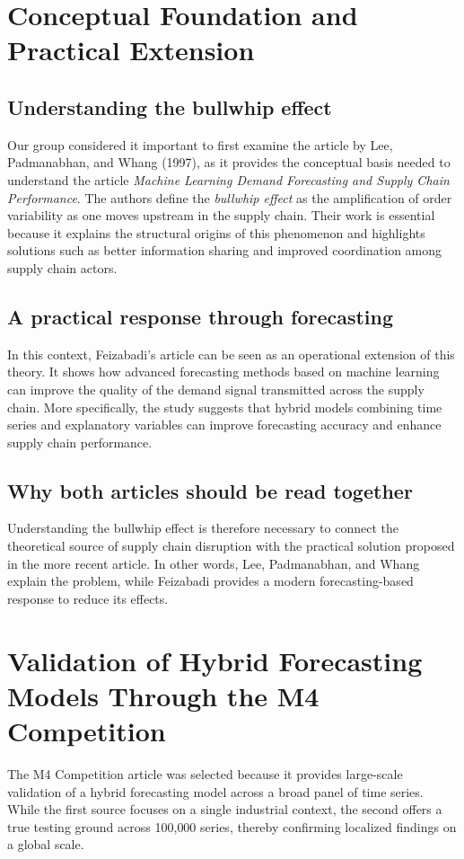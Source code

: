 \section{Conceptual Foundation and Practical Extension}

\subsection{Understanding the bullwhip effect}

Our group considered it important to first examine the article by Lee, Padmanabhan, and Whang (1997), as it provides the conceptual basis needed to understand the article \textit{Machine Learning Demand Forecasting and Supply Chain Performance}. The authors define the \textit{bullwhip effect} as the amplification of order variability as one moves upstream in the supply chain. Their work is essential because it explains the structural origins of this phenomenon and highlights solutions such as better information sharing and improved coordination among supply chain actors.

\subsection{A practical response through forecasting}

In this context, Feizabadi's article can be seen as an operational extension of this theory. It shows how advanced forecasting methods based on machine learning can improve the quality of the demand signal transmitted across the supply chain. More specifically, the study suggests that hybrid models combining time series and explanatory variables can improve forecasting accuracy and enhance supply chain performance.

\subsection{Why both articles should be read together}

Understanding the bullwhip effect is therefore necessary to connect the theoretical source of supply chain disruption with the practical solution proposed in the more recent article. In other words, Lee, Padmanabhan, and Whang explain the problem, while Feizabadi provides a modern forecasting-based response to reduce its effects.

\section{Validation of Hybrid Forecasting Models Through the M4 Competition}

The M4 Competition article was selected because it provides large-scale validation of a hybrid forecasting model across a broad panel of time series. While the first source focuses on a single industrial context, the second offers a true testing ground across 100{,}000 series, thereby confirming localized findings on a global scale.
